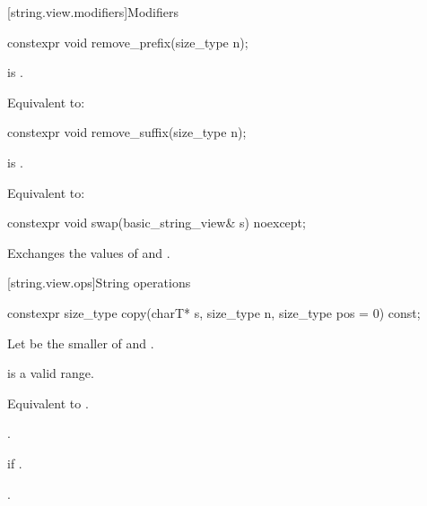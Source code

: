 [string.view.modifiers]{Modifiers}

%
\begin{itemdecl}
constexpr void remove_prefix(size_type n);
\end{itemdecl}

\begin{itemdescr}
\pnum
\hardexpects
{} is .

\pnum
\effects
Equivalent to: 
\end{itemdescr}

%
\begin{itemdecl}
constexpr void remove_suffix(size_type n);
\end{itemdecl}

\begin{itemdescr}
\pnum
\hardexpects
{} is .

\pnum
\effects
Equivalent to: 
\end{itemdescr}

%
\begin{itemdecl}
constexpr void swap(basic_string_view& s) noexcept;
\end{itemdecl}

\begin{itemdescr}
\pnum
\effects
Exchanges the values of  and .
\end{itemdescr}

[string.view.ops]{String operations}

%
\begin{itemdecl}
constexpr size_type copy(charT* s, size_type n, size_type pos = 0) const;
\end{itemdecl}

\begin{itemdescr}
\pnum
Let  be the smaller of  and .

\pnum
\expects
{} is a valid range.

\pnum
\effects
Equivalent to .

\pnum
\returns
{}.

\pnum
\throws
{} if .

\pnum
\complexity
{}.
\end{itemdescr}

